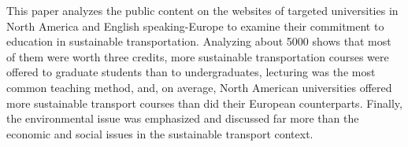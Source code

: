 This paper analyzes the public content on the websites of targeted universities in North America and English speaking-Europe to examine their commitment to education in sustainable transportation. Analyzing about 5000 shows that most of them were worth three credits, more sustainable transportation courses were offered to graduate students than to undergraduates, lecturing was the most common teaching method, and, on average, North American universities offered more sustainable transport courses than did their European counterparts. Finally, the environmental issue was emphasized and discussed far more than the economic and social issues in the sustainable transport context.
